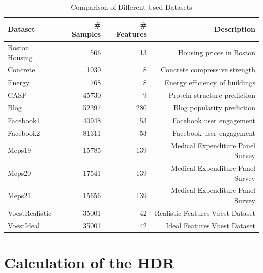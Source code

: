 \begin{table}
    \caption{Comparison of Different Used Datasets}
    \label{tab:dataset_overview}
    \centering
    \begin{tabular}{lrrr}
        \toprule
        Dataset        & \# Samples & \# Features & Description                      \\
        \midrule
        Boston Housing & 506        & 13          & Housing prices in Boston         \\
        Concrete       & 1030       & 8           & Concrete compressive strength    \\
        Energy         & 768        & 8           & Energy efficiency of buildings   \\
        CASP           & 45730      & 9           & Protein structure prediction     \\
        Blog           & 52397      & 280         & Blog popularity prediction       \\
        Facebook1      & 40948      & 53          & Facebook user engagement         \\
        Facebook2      & 81311      & 53          & Facebook user engagement         \\
        Meps19         & 15785      & 139         & Medical Expenditure Panel Survey \\
        Meps20         & 17541      & 139         & Medical Expenditure Panel Survey \\
        Meps21         & 15656      & 139         & Medical Expenditure Panel Survey \\
        VoestRealistic & 35001      & 42          & Realistic Features Voest Dataset \\
        VoestIdeal     & 35001      & 42          & Ideal Features Voest Dataset     \\
        \bottomrule
    \end{tabular}
\end{table}

\section{Calculation of the HDR}

